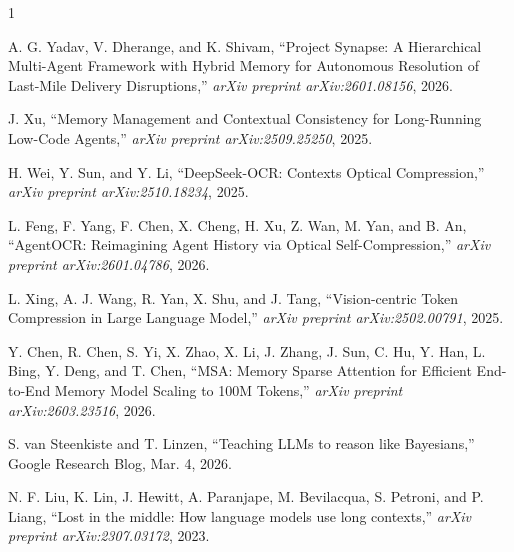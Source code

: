 \documentclass[conference]{IEEEtran}
\begin{document}

\begin{thebibliography}{1}

A. G. Yadav, V. Dherange, and K. Shivam, ``Project Synapse: A Hierarchical Multi-Agent Framework with Hybrid Memory for Autonomous Resolution of Last-Mile Delivery Disruptions,'' \textit{arXiv preprint arXiv:2601.08156}, 2026.

J. Xu, ``Memory Management and Contextual Consistency for Long-Running Low-Code Agents,'' \textit{arXiv preprint arXiv:2509.25250}, 2025.

H. Wei, Y. Sun, and Y. Li, ``DeepSeek-OCR: Contexts Optical Compression,'' \textit{arXiv preprint arXiv:2510.18234}, 2025.

L. Feng, F. Yang, F. Chen, X. Cheng, H. Xu, Z. Wan, M. Yan, and B. An, ``AgentOCR: Reimagining Agent History via Optical Self-Compression,'' \textit{arXiv preprint arXiv:2601.04786}, 2026.

L. Xing, A. J. Wang, R. Yan, X. Shu, and J. Tang, ``Vision-centric Token Compression in Large Language Model,'' \textit{arXiv preprint arXiv:2502.00791}, 2025.

Y. Chen, R. Chen, S. Yi, X. Zhao, X. Li, J. Zhang, J. Sun, C. Hu, Y. Han, L. Bing, Y. Deng, and T. Chen, ``MSA: Memory Sparse Attention for Efficient End-to-End Memory Model Scaling to 100M Tokens,'' \textit{arXiv preprint arXiv:2603.23516}, 2026.

S. van Steenkiste and T. Linzen, ``Teaching LLMs to reason like Bayesians,'' Google Research Blog, Mar. 4, 2026.

N. F. Liu, K. Lin, J. Hewitt, A. Paranjape, M. Bevilacqua, S. Petroni, and P. Liang, ``Lost in the middle: How language models use long contexts,'' \textit{arXiv preprint arXiv:2307.03172}, 2023.

\end{thebibliography}
\end{document}
